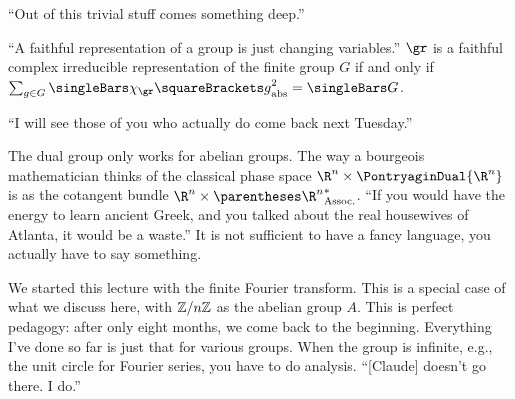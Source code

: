 \documentclass[10pt, a4paper, twoside]{lecturenotes}
\newcommand{\Rn}{{\R^n}}
\begin{document}
\begin{lecture}[date=2013-03-14, official=true]
``Out of this trivial stuff comes something deep.''

``A faithful representation of a group is just changing variables.''
$\gr$ is a faithful complex irreducible representation of the finite group $G$ if and only if $\sum{g\in G} \abs{\Character[\gr]\of g}^2 = \Cardinality G$.

``I will see those of you who actually do come back next Tuesday.''
\end{lecture}
\begin{lecture}[date=2013-03-19, official=true]
The dual group only works for abelian groups. 
The way a bourgeois mathematician thinks of the classical phase space $\Rn\Cartesian\PontryaginDual\Rn$ is as the cotangent bundle $\Rn\Cartesian\Dual{\pa\Rn}$.
``If you would have the energy to learn ancient Greek, and you talked about the real housewives of Atlanta, it would be a waste.'' It is not sufficient to have a fancy language, you actually have to say something.

We started this lecture with the finite Fourier transform. This is a special case of what we discuss here, with $\mathbb{Z} /{n}\mathbb{Z}$ as the abelian group $A$. This is perfect pedagogy: after only eight months, we come back to the beginning. Everything I've done so far is just that for various groups. When the group is infinite, e.g., the unit circle for Fourier series, you have to do analysis. ``[Claude] doesn't go there. I do.''

\end{lecture}
\end{document}
